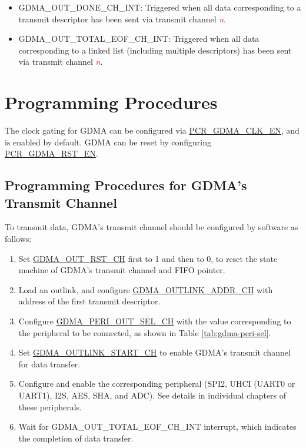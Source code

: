 \documentclass[main\_\_EN.tex]{subfiles}
\begin{document}
\begin{itemize}
\item \label{int:GDMAOUTDONEINT}GDMA\_OUT\_DONE\_CH\_INT: Triggered when all data corresponding to a transmit descriptor has been sent via transmit channel \textcolor{red}{\it{n}}.
\item \label{int:GDMAOUTTOTALEOFINT}GDMA\_OUT\_TOTAL\_EOF\_CH\_INT: Triggered when all data corresponding to a linked list (including multiple descriptors) has been sent via transmit channel \textcolor{red}{\it{n}}.
\end{itemize}


\section{Programming Procedures}

The clock gating for GDMA can be configured via \hyperref[fielddesc:PCRGDMACLKEN]{PCR\_GDMA\_CLK\_EN}, and is enabled by default. GDMA can be reset by configuring \hyperref[fielddesc:PCRGDMARSTEN]{PCR\_GDMA\_RST\_EN}.

\subsection{Programming Procedures for GDMA's Transmit Channel}

To transmit data, GDMA's transmit channel should be configured by software as follows:
\begin{enumerate}
    \item Set \hyperref[fielddesc:GDMAOUTRSTCHN]{GDMA\_OUT\_RST\_CH} first to 1 and then to 0, to reset the state machine of GDMA's transmit channel and FIFO pointer.
    \item Load an outlink, and configure \hyperref[fielddesc:GDMAOUTLINKADDRCHN]{GDMA\_OUTLINK\_ADDR\_CH}  with address of the first transmit descriptor.
    \item Configure \hyperref[fielddesc:GDMAPERIOUTSELCHN]{GDMA\_PERI\_OUT\_SEL\_CH} with the value corresponding to the peripheral to be connected, as shown in Table \ref{tab:gdma-peri-sel}.
    \item Set \hyperref[fielddesc:GDMAOUTLINKSTARTCHN]{GDMA\_OUTLINK\_START\_CH} to enable GDMA's transmit channel for data transfer.
    \item Configure and enable the corresponding peripheral (SPI2, UHCI (UART0 or UART1), I2S, AES, SHA, and ADC). See details in individual chapters of these peripherals.
    \item Wait for GDMA\_OUT\_TOTAL\_EOF\_CH\_INT interrupt, which indicates the completion of data transfer.
\end{enumerate}
\end{document}
